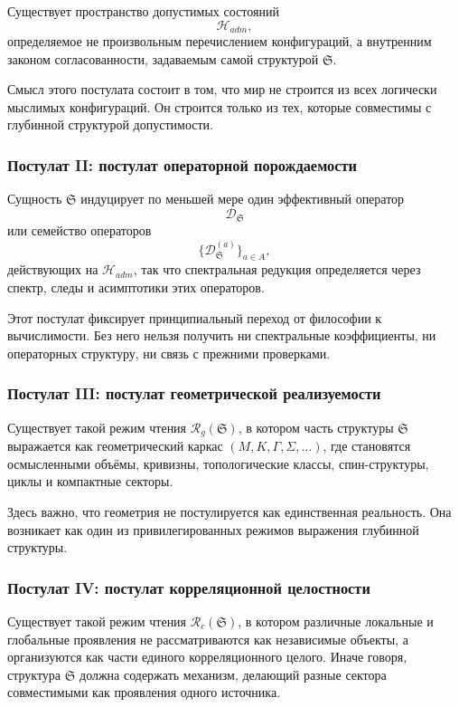 \documentclass[12pt,a4paper]{article}
\begin{document}
Существует пространство допустимых состояний
\[
\mathcal{H}_{adm},
\]
определяемое не произвольным перечислением конфигураций, а внутренним законом согласованности, задаваемым самой структурой \(\mathfrak{S}\).

Смысл этого постулата состоит в том, что мир не строится из всех логически мыслимых конфигураций. Он строится только из тех, которые совместимы с глубинной структурой допустимости.

\subsubsection*{Постулат II: постулат операторной порождаемости}

Сущность \(\mathfrak{S}\) индуцирует по меньшей мере один эффективный оператор
\[
\mathcal{D}_{\mathfrak{S}}
\]
или семейство операторов
\[
\{\mathcal{D}_{\mathfrak{S}}^{(a)}\}_{a\in A},
\]
действующих на \(\mathcal{H}_{adm}\), так что спектральная редукция определяется через спектр, следы и асимптотики этих операторов.

Этот постулат фиксирует принципиальный переход от философии к вычислимости. Без него нельзя получить ни спектральные коэффициенты, ни операторных структуру, ни связь с прежними проверками.

\subsubsection*{Постулат III: постулат геометрической реализуемости}

Существует такой режим чтения \(\mathcal{R}_g(\mathfrak{S})\), в котором часть структуры \(\mathfrak{S}\) выражается как геометрический каркас \((M,K,\Gamma,\Sigma,\ldots)\), где становятся осмысленными объёмы, кривизны, топологические классы, спин-структуры, циклы и компактные секторы.

Здесь важно, что геометрия не постулируется как единственная реальность. Она возникает как один из привилегированных режимов выражения глубинной структуры.

\subsubsection*{Постулат IV: постулат корреляционной целостности}

Существует такой режим чтения \(\mathcal{R}_c(\mathfrak{S})\), в котором различные локальные и глобальные проявления не рассматриваются как независимые объекты, а организуются как части единого корреляционного целого. Иначе говоря, структура \(\mathfrak{S}\) должна содержать механизм, делающий разные сектора совместимыми как проявления одного источника.
\end{document}
